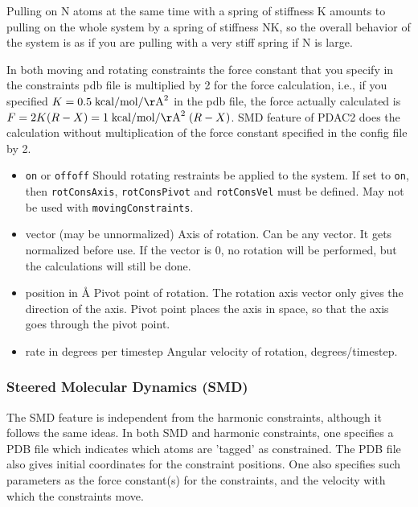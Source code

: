 Pulling on N atoms at the same time with a spring of stiffness K
   amounts to pulling on the whole system by a spring of stiffness NK,
   so the overall behavior of the system is as if you are pulling with a
   very stiff spring if N is large.

In both moving and rotating constraints the force constant that you
   specify in the constraints pdb file is multiplied by 2 for the force
   calculation, i.e., if you specified $K = 0.5 \; {\rm kcal}/{\rm mol}/{\rm \AA}^2$ in the pdb
file,
   the force actually calculated is $F = 2 K (R-X) = 1 \; {\rm kcal}/{\rm mol}/{\rm \AA}^2 \; (R-X)$.
   SMD feature of PDAC2 does the calculation without multiplication of
the
   force constant specified in the config file by 2.


\begin{itemize}

\item
{}
{{\tt on} or {\tt off}}{{\tt off}}
{Should rotating restraints be applied to the system. If set
to {\tt on}, then {\tt rotConsAxis}, {\tt rotConsPivot} and
{\tt rotConsVel} must be defined.
May not be used with {\tt movingConstraints}.}

\item
{}
{vector (may be unnormalized)}
{Axis of rotation. Can be any vector. It gets
normalized before use. If the vector is 0,
no rotation will be performed, but the calculations
will still be done.}

\item
{}
{position in \AA}
{Pivot point of rotation. The rotation axis vector
only gives the direction of the axis. Pivot point
places the axis in space, so that the axis goes
through the pivot point.}

\item
{}
{rate in degrees per timestep}
{Angular velocity of rotation, degrees/timestep.}

\end{itemize}


\subsubsection{Steered Molecular Dynamics (SMD)}

The SMD feature is independent from the harmonic constraints, although it
follows the same ideas.  In both SMD and harmonic constraints, one specifies
a PDB file which indicates which atoms are 'tagged' as constrained.  The PDB
file also gives initial coordinates for the constraint positions.  One also
specifies such parameters as the force constant(s) for the constraints, 
and the velocity with which the constraints move.  


